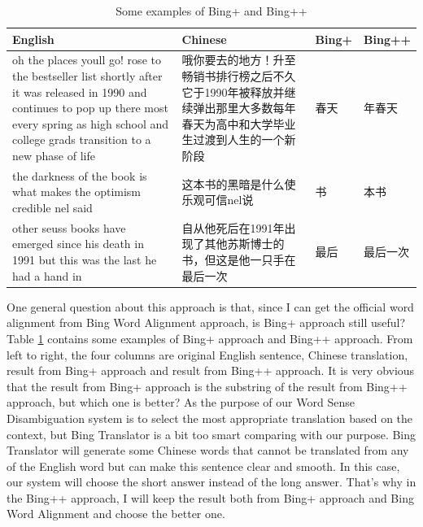 \begin{table}[ht]
    \caption{Some examples of Bing+ and Bing++}
    \label{table:bing_plus_plus_3}
    \begin{tabular}{| p{5cm} | p{5cm} | p{2cm} | p{2cm} |}      
        \hline
        English & Chinese & Bing+ & Bing++ \\
        \hline
        oh the places youll go! rose to the bestseller list shortly after it was released in 1990 and continues to pop up there most every spring as high school and college grads transition to a new phase of life & 哦你要去的地方！升至畅销书排行榜之后不久它于1990年被释放并继续弹出那里大多数每年春天为高中和大学毕业生过渡到人生的一个新阶段 & 春天 & 年春天\\
        \hline
        the darkness of the book is what makes the optimism credible nel said & 这本书的黑暗是什么使乐观可信nel说 & 书 & 本书\\
        \hline
        other seuss books have emerged since his death in 1991 but this was the last he had a hand in & 自从他死后在1991年出现了其他苏斯博士的书，但这是他一只手在最后一次 & 最后 & 最后一次\\
        \hline
    \end{tabular}
\end{table}

One general question about this approach is that, since I can get the official word alignment from Bing Word Alignment approach, is Bing+ approach still useful? Table \ref{table:bing_plus_plus_3} contains some examples of Bing+ approach and Bing++ approach. From left to right, the four columns are original English sentence, Chinese translation, result from Bing+ approach and result from Bing++ approach. It is very obvious that the result from Bing+ approach is the substring of the result from Bing++ approach, but which one is better? As the purpose of our Word Sense Disambiguation system is to select the most appropriate translation based on the context, but Bing Translator is a bit too smart comparing with our purpose. Bing Translator will generate some Chinese words that cannot be translated from any of the English word but can make this sentence clear and smooth. In this case, our system will choose the short answer instead of the long answer. That's why in the Bing++ approach, I will keep the result both from Bing+ approach and Bing Word Alignment and choose the better one.
\\

